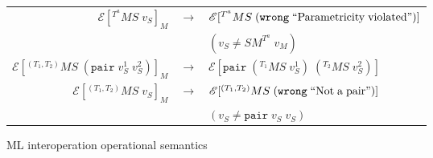 \begin{figure}
\begin{center}
\begin{tabular}{rcl}
$\mathscr{E}[^{T^{a}}MS\;v_{S}]_{M}$ & $\rightarrow$ & $\mathscr{E}[^{T^{a}}MS\;(\mathtt{wrong}\;\mathrm{``Parametricity\;violated"})]$ \\
&& $(v_{S}\neq SM^{T^{a}}\;v_{M})$ \\
$\mathscr{E}[^{(T_{1},T_{2})}MS\;(\mathtt{pair}\;v_{S}^{1}\;v_{S}^{2})]_{M}$ & $\rightarrow$ & $\mathscr{E}[\mathtt{pair}\;(^{T_{1}}MS\;v_{S}^{1})\;(^{T_{2}}MS\;v_{S}^{2})]$ \\
$\mathscr{E}[^{(T_{1},T_{2})}MS\;v_{S}]_{M}$ & $\rightarrow$ & $\mathscr{E}[^{(T_{1},T_{2})}MS\;(\mathtt{wrong}\;\mathrm{``Not\;a\;pair"})]$ \\
&& $(v_{S}\neq\mathtt{pair}\;v_{S}\;v_{S})$ \\
\end{tabular}
\end{center}
\caption{ML interoperation operational semantics}
\label{fig:mios}
\end{figure}